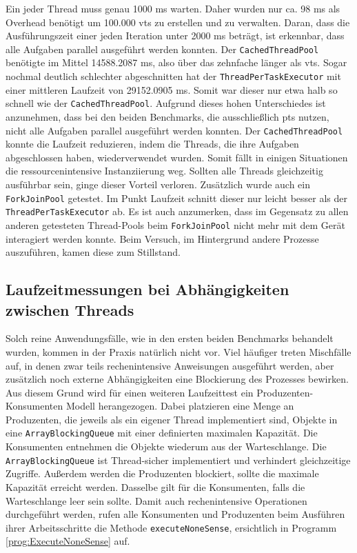     Ein jeder Thread muss genau
    1000 ms warten. Daher wurden nur ca. 98 ms als Overhead benötigt um 100.000 \Glspl{vt} zu erstellen und zu verwalten. Daran, dass die Ausführungszeit einer jeden Iteration unter 2000 ms beträgt, ist
    erkennbar, dass alle Aufgaben parallel ausgeführt werden konnten.
    Der \texttt{CachedThreadPool} benötigte im Mittel 14588.2087 ms, also über das zehnfache länger als \Glspl{vt}.
    Sogar nochmal deutlich schlechter abgeschnitten hat der \texttt{ThreadPerTaskExecutor} mit einer mittleren Laufzeit von 29152.0905 ms. Somit war dieser nur etwa halb so schnell wie
    der \texttt{CachedThreadPool}. Aufgrund dieses hohen Unterschiedes ist anzunehmen, dass bei den beiden Benchmarks, die ausschließlich \Glspl{pt} nutzen, nicht alle Aufgaben parallel ausgeführt
    werden konnten. Der \texttt{CachedThreadPool} konnte die Laufzeit reduzieren, indem die Threads, die ihre Aufgaben abgeschlossen haben, wiederverwendet wurden. Somit fällt in einigen Situationen 
    die ressourcenintensive Instanziierung weg. Sollten alle Threads gleichzeitig ausführbar sein, ginge dieser Vorteil verloren. Zusätzlich wurde auch ein \texttt{ForkJoinPool} getestet. 
    Im Punkt Laufzeit schnitt dieser nur leicht besser als der \texttt{ThreadPerTaskExecutor} ab. Es ist auch anzumerken, dass 
    im Gegensatz zu allen anderen getesteten Thread-Pools beim \texttt{ForkJoinPool} nicht mehr mit dem Gerät interagiert werden konnte. Beim Versuch, im Hintergrund andere Prozesse auszuführen, kamen diese zum 
    Stillstand. 

\subsection{Laufzeitmessungen bei Abhängigkeiten zwischen Threads}
\label{subsec:LaufzeitmessungenbeiAbhängigkeitenzwischenThreads}

    Solch reine Anwendungsfälle, wie in den ersten beiden Benchmarks behandelt wurden, kommen in der Praxis natürlich nicht vor. Viel häufiger treten Mischfälle auf, in denen zwar teils rechenintensive Anweisungen
    ausgeführt werden,
    aber zusätzlich noch externe Abhängigkeiten eine Blockierung des Prozesses bewirken. Aus diesem Grund wird für einen weiteren Laufzeittest ein Produzenten-Konsumenten Modell herangezogen.
    Dabei platzieren eine Menge an Produzenten, die jeweils als ein eigener Thread implementiert sind, Objekte in eine \texttt{ArrayBlockingQueue} mit einer definierten maximalen Kapazität.
    Die Konsumenten entnehmen die Objekte wiederum aus der Warteschlange. Die \texttt{ArrayBlockingQueue} ist Thread-sicher implementiert und verhindert gleichzeitige Zugriffe. Außerdem werden 
    die Produzenten blockiert, sollte die maximale Kapazität erreicht werden. Dasselbe gilt für die Konsumenten, falls die Warteschlange leer sein sollte. 
    Damit auch rechenintensive Operationen durchgeführt werden, rufen alle Konsumenten und Produzenten beim Ausführen ihrer Arbeitsschritte die Methode \texttt{executeNoneSense}, ersichtlich
    in Programm \ref{prog:ExecuteNoneSense} auf.

